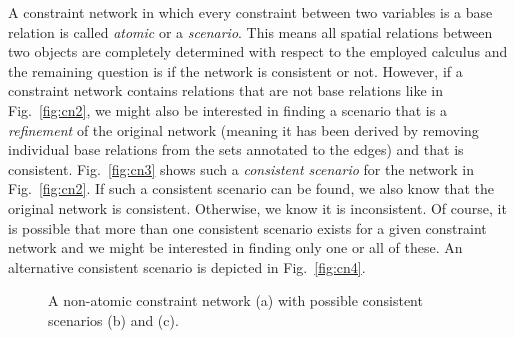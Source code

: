 \documentclass[headsepline]{scrreprt}
\theoremstyle{definition}
\newlength{\rest}
\begin{document}
A constraint network in which every constraint between
two variables is a base relation is called \emph{atomic}
or a \emph{scenario}. This means all spatial relations
between two objects are completely determined with
respect to the employed calculus and the remaining
question is if the network is consistent or not.
However, if a constraint network contains relations
that are not base relations like in Fig.~\ref{fig:cn2},
we might also be interested in finding a scenario
that is a \emph{refinement} of the original network
(meaning it has been derived by removing individual base
relations from the sets annotated to the edges) and
that is consistent. Fig.~\ref{fig:cn3} shows such a
\emph{consistent scenario} for the network in
Fig.~\ref{fig:cn2}. If such a consistent scenario
can be found, we also know that the original network
is consistent. Otherwise, we know it is inconsistent.
Of course, it is possible that more than one
consistent scenario exists for a given constraint
network and we might be interested in finding
only one or all of these. An alternative
consistent scenario is depicted in Fig.~\ref{fig:cn4}.

\begin{figure}[ht]
	\centering
	\caption{A non-atomic constraint network (a) with possible consistent
scenarios (b) and (c).}
	\label{fig:br2}
\end{figure}
\end{document}
